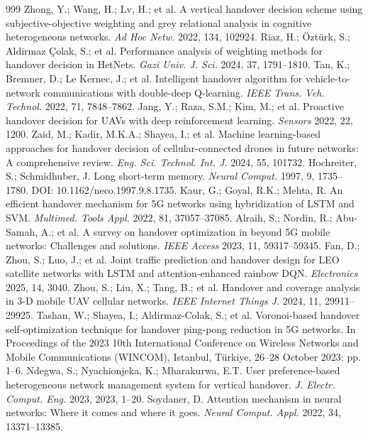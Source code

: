 \documentclass[final,3p,times,twocolumn]{elsarticle}
\begin{document}
\begin{thebibliography}{999}
Zhong, Y.; Wang, H.; Lv, H.; et al. A vertical handover decision scheme using subjective-objective weighting and grey relational analysis in cognitive heterogeneous networks. {\em Ad Hoc Netw.} 2022, 134, 102924.
Riaz, H.; Öztürk, S.; Aldirmaz Çolak, S.; et al. Performance analysis of weighting methods for handover decision in HetNets. {\em Gazi Univ. J. Sci.} 2024, 37, 1791--1810.
Tan, K.; Bremner, D.; Le Kernec, J.; et al. Intelligent handover algorithm for vehicle-to-network communications with double-deep Q-learning. {\em IEEE Trans. Veh. Technol.} 2022, 71, 7848--7862.
Jang, Y.; Raza, S.M.; Kim, M.; et al. Proactive handover decision for UAVs with deep reinforcement learning. {\em Sensors} 2022, 22, 1200.
Zaid, M.; Kadir, M.K.A.; Shayea, I.; et al. Machine learning-based approaches for handover decision of cellular-connected drones in future networks: A comprehensive review. {\em Eng. Sci. Technol. Int. J.} 2024, 55, 101732.
Hochreiter, S.; Schmidhuber, J. Long short-term memory. {\em Neural Comput.} 1997, 9, 1735--1780. DOI: 10.1162/neco.1997.9.8.1735.
Kaur, G.; Goyal, R.K.; Mehta, R. An efficient handover mechanism for 5G networks using hybridization of LSTM and SVM. {\em Multimed. Tools Appl.} 2022, 81, 37057--37085.
Alraih, S.; Nordin, R.; Abu-Samah, A.; et al. A survey on handover optimization in beyond 5G mobile networks: Challenges and solutions. {\em IEEE Access} 2023, 11, 59317--59345.
Fan, D.; Zhou, S.; Luo, J.; et al. Joint traffic prediction and handover design for LEO satellite networks with LSTM and attention-enhanced rainbow DQN. {\em Electronics} 2025, 14, 3040.
Zhou, S.; Liu, X.; Tang, B.; et al. Handover and coverage analysis in 3-D mobile UAV cellular networks. {\em IEEE Internet Things J.} 2024, 11, 29911--29925.
Tashan, W.; Shayea, I.; Aldirmaz-Colak, S.; et al. Voronoi-based handover self-optimization technique for handover ping-pong reduction in 5G networks. In Proceedings of the 2023 10th International Conference on Wireless Networks and Mobile Communications (WINCOM), Istanbul, Türkiye, 26--28 October 2023; pp. 1--6.
Ndegwa, S.; Nyachionjeka, K.; Mharakurwa, E.T. User preference-based heterogeneous network management system for vertical handover. {\em J. Electr. Comput. Eng.} 2023, 2023, 1--20.
Soydaner, D. Attention mechanism in neural networks: Where it comes and where it goes. {\em Neural Comput. Appl.} 2022, 34, 13371--13385.

\end{thebibliography}
\end{document}
